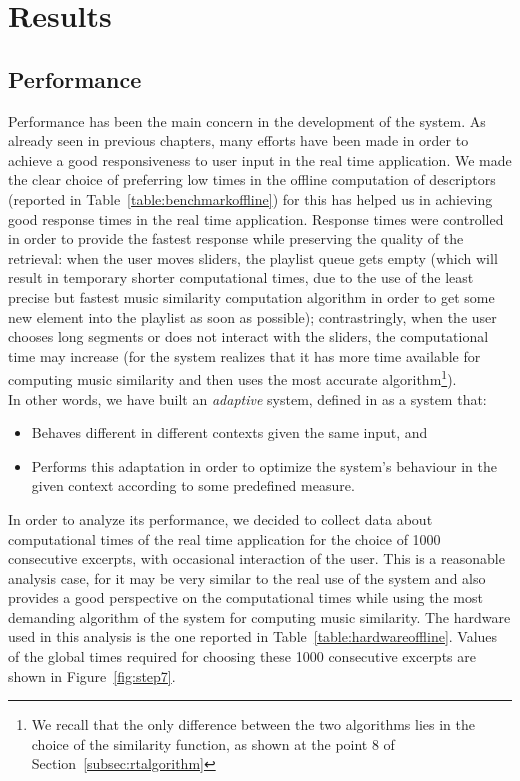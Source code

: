 \chapter{Results} 

\label{Chapter7} 


\section{Performance}
\label{sec:performanceanalysis}
Performance has been the main concern in the development of the system. As already seen in previous chapters, many efforts have been made in order to achieve a good responsiveness to user input in the real time application. We made the clear choice of preferring low times in the offline computation of descriptors (reported in Table~\ref{table:benchmarkoffline}) for this has helped us in achieving good response times in the real time application. Response times were controlled in order to provide the fastest response while preserving the quality of the retrieval: when the user moves sliders, the playlist queue gets empty (which will result in temporary shorter computational times, due to the use of the least precise but fastest music similarity computation algorithm in order to get some new element into the playlist as soon as possible); contrastringly, when the user chooses long segments or does not interact with the sliders, the computational time may increase (for the system realizes that it has more time available for computing music similarity and then uses the most accurate algorithm\footnote{We recall that the only difference between the two algorithms lies in the choice of the similarity function, as shown at the point 8 of Section~\ref{subsec:rtalgorithm}}). \\
In other words, we have built an \textit{adaptive} system, defined in \cite{stober11} as a system that:
\begin{itemize}
\item Behaves different in different contexts given the same input, and
\item Performs this adaptation in order to optimize the system's behaviour in the given context according to some predefined measure.
\end{itemize}
In order to analyze its performance, we decided to collect data about computational times of the real time application for the choice of 1000 consecutive excerpts, with occasional interaction of the user. This is a reasonable analysis case, for it may be very similar to the real use of the system and also provides a good perspective on the computational times while using the most demanding algorithm of the system for computing music similarity. The hardware used in this analysis is the one reported in Table~\ref{table:hardwareoffline}. Values of the global times required for choosing these 1000 consecutive excerpts are shown in Figure~\ref{fig:step7}. 

